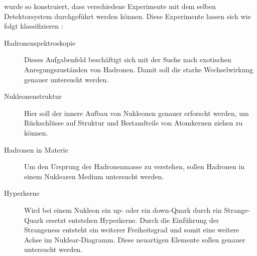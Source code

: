 \pnd{} wurde so konstruiert, dass verschiedene Experimente mit dem selben Detektorsystem durchgeführt werden können. Diese Experimente lassen sich wie folgt klassifizieren \cite{PANDA_physics_overview}:

\label{panda_experimentklassen}
\begin{description}
	\item[Hadronenspektroskopie] Dieses Aufgabenfeld beschäftigt sich mit der Suche nach exotischen Anregungszuständen von Hadronen. Damit soll die starke Wechselwirkung genauer untersucht werden.
	\item[Nukleonenstruktur] Hier soll der innere Aufbau von Nukleonen genauer erforscht werden, um Rückschlüsse auf Struktur und Bestandteile von Atomkernen ziehen zu können.
	\item[Hadronen in Materie] Um den Ursprung der Hadronenmasse zu verstehen, sollen Hadronen in einem Nuklearen Medium untersucht werden.
	\item[Hyperkerne] Wird bei einem Nukleon ein up- oder ein down-Quark durch ein Strange-Quark ersetzt entstehen Hyperkerne. Durch die Einführung der Strangeness entsteht ein weiterer Freiheitsgrad und somit eine weitere Achse im Nuklear-Diagramm. Diese neuartigen Elemente sollen genauer untersucht werden.
\end{description}

